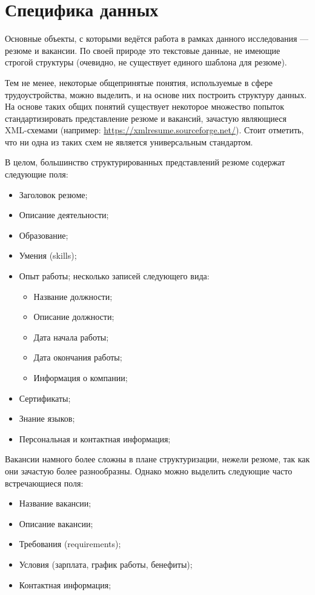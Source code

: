 \documentclass[14pt]{mmcs_article}
\begin{document}
\newpage
\section{Специфика данных}\label{data_specification}

Основные объекты, с которыми ведётся работа в рамках данного исследования --- резюме и вакансии. По своей природе это текстовые данные, не имеющие строгой структуры (очевидно, не существует единого шаблона для резюме).

Тем не менее, некоторые общепринятые понятия, используемые в сфере трудоустройства, можно выделить, и на основе них построить структуру данных. На основе таких общих понятий существует некоторое множество попыток стандартизировать представление резюме и вакансий, зачастую являющиеся XML-схемами (например: \url{https://xmlresume.sourceforge.net/}). Стоит отметить, что ни одна из таких схем не является универсальным стандартом.

В целом, большинство структурированных представлений резюме содержат следующие поля:

\begin{itemize}
  \item Заголовок резюме;
  \item Описание деятельности;
  \item Образование;
  \item Умения (skills);
  \item Опыт работы; несколько записей следующего вида:
        \begin{itemize}
          \item Название должности;
          \item Описание должности;
          \item Дата начала работы;
          \item Дата окончания работы;
          \item Информация о компании;
        \end{itemize}
  \item Сертификаты;
  \item Знание языков;
  \item Персональная и контактная информация;
\end{itemize}

Вакансии намного более сложны в плане структуризации, нежели резюме, так как они зачастую более разнообразны. Однако можно выделить следующие часто встречающиеся поля:

\begin{itemize}
  \item Название вакансии;
  \item Описание вакансии;
  \item Требования (requirements);
  \item Условия (зарплата, график работы, бенефиты);
  \item Контактная информация;
\end{itemize}
\end{document}

